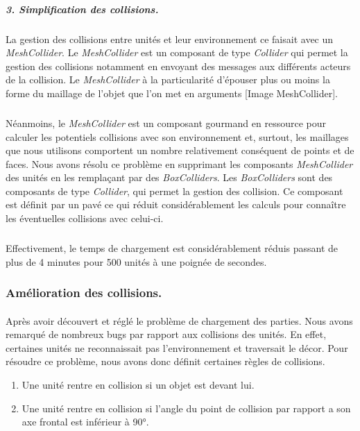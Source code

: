 \documentclass{report}
\begin{document}
\subparagraph{3. Simplification des collisions.} La gestion des collisions entre unités et leur environnement ce faisait avec un \textit{MeshCollider}. Le \textit{MeshCollider} est un composant de type \textit{Collider} qui permet la gestion des collisions notamment en envoyant des messages aux différents acteurs de la collision. Le \textit{MeshCollider} à la particularité d'épouser plus ou moins la forme du maillage de l'objet que l'on met en arguments [Image MeshCollider]. 
\subparagraph{}Néanmoins, le \textit{MeshCollider} est un composant gourmand en ressource pour calculer les potentiels collisions avec son environnement et, surtout, les maillages que nous utilisons comportent un nombre relativement conséquent de points et de faces. Nous avons résolu ce problème en supprimant les composants \textit{MeshCollider} des unités en les remplaçant par des  \textit{BoxColliders}. Les \textit{BoxColliders} sont des composants de type \textit{Collider}, qui permet la gestion des collision. Ce composant est définit par un pavé ce qui réduit considérablement les calculs pour connaître les éventuelles collisions avec celui-ci.
\subparagraph{}Effectivement, le temps de chargement est considérablement réduis passant de plus de 4 minutes pour 500 unités à une poignée de secondes.



\subsubsection{Amélioration des collisions.}
\paragraph{} Après avoir découvert et réglé le problème de chargement des parties. Nous avons remarqué de nombreux bugs par rapport aux collisions des unités. En effet, certaines unités ne reconnaissait pas l'environnement et traversait le décor. Pour résoudre ce problème, nous avons donc définit certaines règles de collisions.
\begin{enumerate}
\item Une unité rentre en collision si un objet est devant lui. 
\item Une unité rentre en collision si l'angle du point de collision par rapport a son axe frontal est inférieur à 90°.
\end{enumerate}
\end{document}
